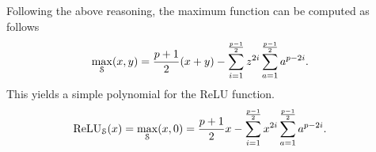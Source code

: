   Following the above reasoning, the maximum function can be computed as follows
  \begin{align*}
    \max_\S(x,y) &= \frac{p+1}{2} (x+y) - \sum_{i=1}^{\frac{p-1}{2}} z^{2i} \sum_{a=1}^{\frac{p-1}{2}} a^{p-2i}.
  \end{align*}
   This yields a simple polynomial for the ReLU function.
  \begin{align*}
    \ReLU_\S(x) = \max_\S(x,0) &= \frac{p+1}{2} x - \sum_{i=1}^{\frac{p-1}{2}} x^{2i} \sum_{a=1}^{\frac{p-1}{2}} a^{p-2i}.
  \end{align*}

